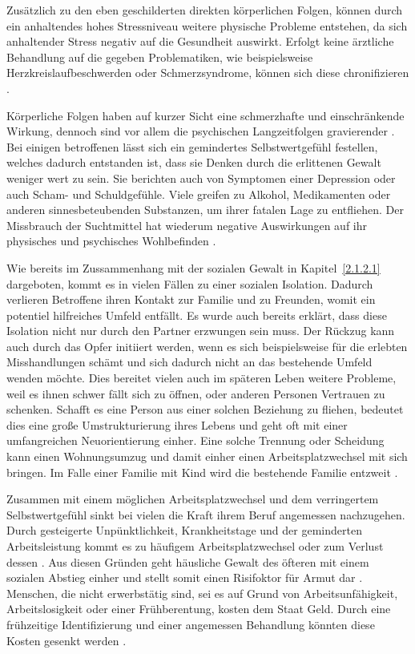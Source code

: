 Zusätzlich zu den eben geschilderten direkten körperlichen Folgen, können durch ein anhaltendes hohes Stressniveau weitere physische Probleme entstehen, da sich anhaltender Stress negativ auf die Gesundheit auswirkt. Erfolgt keine ärztliche Behandlung auf die gegeben Problematiken, wie beispielsweise Herzkreislaufbeschwerden oder Schmerzsyndrome, können sich diese chronifizieren \parencite{Gewaltart}.

Körperliche Folgen haben auf kurzer Sicht eine schmerzhafte und einschränkende Wirkung, dennoch sind vor allem die psychischen Langzeitfolgen gravierender \parencite{Def_haus_Gewalt_2, Def_Form_Folge_Gewalt}. Bei einigen betroffenen lässt sich ein gemindertes Selbstwertgefühl festellen, welches dadurch entstanden ist, dass sie Denken durch die erlittenen Gewalt weniger wert zu sein. Sie berichten auch von Symptomen einer Depression oder auch Scham- und Schuldgefühle. Viele greifen zu Alkohol, Medikamenten oder anderen sinnesbeteubenden Substanzen, um ihrer fatalen Lage zu entfliehen. Der Missbrauch der Suchtmittel hat wiederum negative Auswirkungen auf ihr physisches und psychisches Wohlbefinden \parencite{Def_haus_Gewalt_2, Gewaltart}.

Wie bereits im Zussammenhang mit der sozialen Gewalt in Kapitel~\ref{2.1.2.1} dargeboten, kommt es in vielen Fällen zu einer sozialen Isolation. Dadurch verlieren Betroffene ihren Kontakt zur Familie und zu Freunden, womit ein potentiel hilfreiches Umfeld entfällt. Es wurde auch bereits erklärt, dass diese Isolation nicht nur durch den Partner erzwungen sein muss. Der Rückzug kann auch durch das Opfer initiiert werden, wenn es sich beispielsweise für die erlebten Misshandlungen schämt und sich dadurch nicht an das bestehende Umfeld wenden möchte. Dies bereitet vielen auch im späteren Leben weitere Probleme, weil es ihnen schwer fällt sich zu öffnen, oder anderen Personen Vertrauen zu schenken. Schafft es eine Person aus einer solchen Beziehung zu fliehen, bedeutet dies eine große Umstrukturierung ihres Lebens und geht oft mit einer umfangreichen Neuorientierung einher. Eine solche Trennung oder Scheidung kann einen Wohnungsumzug und damit einher einen Arbeitsplatzwechsel mit sich bringen. Im Falle einer Familie mit Kind wird die bestehende Familie entzweit \parencite{Gewaltart, Def_haus_Gewalt_2, Def_Form_Folge_Gewalt}.

Zusammen mit einem möglichen Arbeitsplatzwechsel und dem verringertem Selbstwertgefühl sinkt bei vielen die Kraft ihrem Beruf angemessen nachzugehen. Durch gesteigerte Unpünktlichkeit, Krankheitstage und der geminderten Arbeitsleistung kommt es zu häufigem Arbeitsplatzwechsel oder zum Verlust dessen \parencite{Def_haus_Gewalt, Def_haus_Gewalt_2, Def_Form_Folge_Gewalt, Gewaltart}. Aus diesen Gründen geht häusliche Gewalt des öfteren mit einem sozialen Abstieg einher und stellt somit einen Risifoktor für Armut dar \parencite{Def_haus_Gewalt_2, Gewaltart}. Menschen, die nicht erwerbstätig sind, sei es auf Grund von Arbeitsunfähigkeit, Arbeitslosigkeit oder einer Frühberentung, kosten dem Staat Geld. Durch eine frühzeitige Identifizierung und einer angemessen Behandlung könnten diese Kosten gesenkt werden \parencite{Def_haus_Gewalt, Def_Form_Folge_Gewalt}. 

